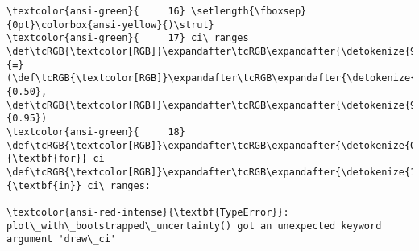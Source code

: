 \documentclass[11pt]{article}
\begin{document}
\begin{Verbatim}[commandchars=\\\{\}, frame=single, framerule=2mm, rulecolor=\color{outerrorbackground}]
\textcolor{ansi-green}{     16} \setlength{\fboxsep}{0pt}\colorbox{ansi-yellow}{)\strut}
\textcolor{ansi-green}{     17} ci\_ranges \def\tcRGB{\textcolor[RGB]}\expandafter\tcRGB\expandafter{\detokenize{98,98,98}}{=} (\def\tcRGB{\textcolor[RGB]}\expandafter\tcRGB\expandafter{\detokenize{98,98,98}}{0.50}, \def\tcRGB{\textcolor[RGB]}\expandafter\tcRGB\expandafter{\detokenize{98,98,98}}{0.95})
\textcolor{ansi-green}{     18} \def\tcRGB{\textcolor[RGB]}\expandafter\tcRGB\expandafter{\detokenize{0,135,0}}{\textbf{for}} ci \def\tcRGB{\textcolor[RGB]}\expandafter\tcRGB\expandafter{\detokenize{175,0,255}}{\textbf{in}} ci\_ranges:

\textcolor{ansi-red-intense}{\textbf{TypeError}}: plot\_with\_bootstrapped\_uncertainty() got an unexpected keyword argument 'draw\_ci'
    \end{Verbatim}

    \begin{center}
    \end{center}
    { \hspace*{\fill} \\}
    
    


    
    
    
\end{document}
